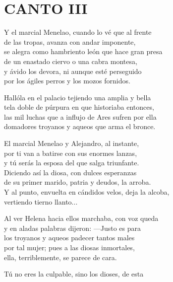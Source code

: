 \bnum
\section*{\centering\textbf{CANTO III}}
%
\separator
%
\postart
{}
Y el marcial Menelao, cuando lo vé que al frente\\
de las tropas, avanza con andar imponente,\\
se alegra como hambriento león que hace gran presa\\
de un enastado ciervo o una cabra montesa,\\
y ávido los devora, ni aunque esté perseguido\\
por los ágiles perros y los mozos fornidos.\par
\poend
%
\separator
%
\postart
{}
Hallóla en el palacio tejiendo una amplia y bella\\
tela doble de púrpura en que historiaba entonces,\\
las mil luchas que a influjo de Ares sufren por ella\\
domadores troyanos y aqueos que arma el bronce.\par
\poend
%
\separator
%
\postart
{}
El marcial Menelao y Alejandro, al instante,\\
por ti van a batirse con sus enormes lanzas,\\
y tú serás la esposa del que salga triunfante.\\
Diciendo así la diosa, con dulces esperanzas\\
de su primer marido, patria y deudos, la arroba.\\
Y al punto, envuelta en cándidos velos, deja la alcoba,\\
vertiendo tierno llanto...\par
\poend
%
\separator
%
\postart
{}
Al ver Helena hacia ellos marchaba, con voz queda\\
y en aladas palabras dijeron: ---Justo es para\\
los troyanos y aqueos padecer tantos males\\
por tal mujer; pues a las diosas inmortales,\\
ella, terriblemente, se parece de cara.\par
\poend
%
\separator
%
\postart
{}
Tú no eres la culpable, sino los dioses, de esta\\
